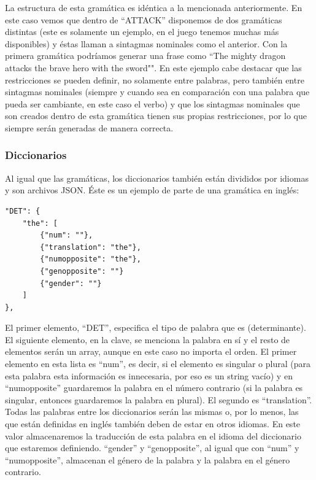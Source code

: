 La estructura de esta gramática es idéntica a la mencionada anteriormente. En este caso vemos que dentro de ``ATTACK'' disponemos de dos gramáticas distintas (este es solamente un ejemplo, en el juego tenemos muchas más disponibles) y éstas llaman a sintagmas nominales como el anterior.
Con la primera gramática podríamos generar una frase como ``The mighty dragon attacks the brave hero with the sword"". En este ejemplo cabe destacar que las restricciones se pueden definir, no solamente entre palabras, pero también entre sintagmas nominales (siempre y cuando sea en comparación con una palabra que pueda ser cambiante, en este caso el verbo) y que los sintagmas nominales que son creados dentro de esta gramática tienen sus propias restricciones, por lo que siempre serán generadas de manera correcta.

\subsubsection{Diccionarios}

Al igual que las gramáticas, los diccionarios también están divididos por idiomas y son archivos JSON. Éste es un ejemplo de parte de una gramática en inglés:

\begin{lstlisting}[style=json]
"DET": {
    "the": [
        {"num": ""},
        {"translation": "the"},
        {"numopposite": "the"},
        {"genopposite": ""}
        {"gender": ""}
    ]
},
\end{lstlisting}

El primer elemento, ``DET'', especifica el tipo de palabra que es (determinante). El siguiente elemento, en la clave, se menciona la palabra en sí y el resto de elementos serán un array, aunque en este caso no importa el orden. El primer elemento en esta lista es ``num'', es decir, si el elemento es singular o plural (para esta palabra esta información es innecesaria, por eso es un string vacío) y en ``numopposite'' guardaremos la palabra en el número contrario (si la palabra es singular, entonces guardaremos la palabra en plural).
El segundo es ``translation''. Todas las palabras entre los diccionarios serán las mismas o, por lo menos, las que están definidas en inglés también deben de estar en otros idiomas. En este valor almacenaremos la traducción de esta palabra en el idioma del diccionario que estaremos definiendo.
``gender'' y ``genopposite'', al igual que con ``num'' y ``numopposite'', almacenan el género de la palabra y la palabra en el género contrario.

